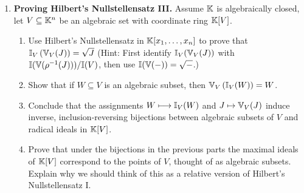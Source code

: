 \documentclass[12pt,reqno]{amsart}
\begin{document}
\begin{enumerate}[leftmargin=*]
\item\label{ex:hilb3-3} \textbf{Proving Hilbert's Nullstellensatz III.} Assume $\mathbb{K}$ is algebraically closed, let $V\subseteq \mathbb{K}^n$ be an algebraic set with coordinate ring $\mathbb{K}[V]$.
\begin{enumerate}[label=(\alph*),ref=\theenumi\alph*]
	\item Use Hilbert's Nullstellensatz in $\mathbb{K}[x_1,\ldots,x_n]$ to prove that $\mathbb{I}_V\left(\mathbb{V}_V(J )\right)=\sqrt{J}$ (Hint: First identify $\mathbb{I}_V(\mathbb{V}_V(J))$ with $\mathbb{I}(\mathbb{V}(\rho^{-1}(J)))/\mathbb{I}(V)$, then use $\mathbb{I}(\mathbb{V}(-))=\sqrt{-}$.)

	\item Show that if $W\subseteq V$ is an algebraic subset, then $\mathbb{V}_V\left(\mathbb{I}_V(W)\right)=W$.

	\item Conclude that the assignments $W\longmapsto \mathbb{I}_V(W)$ and $J\mapsto \mathbb{V}_V(J)$ induce inverse, inclusion-reversing bijections between algebraic subsets of $V$ and radical ideals in $\mathbb{K}[V]$. 

	\item Prove that under the bijections in the previous parts the maximal ideals of $\mathbb{K}[V]$ correspond to the points of $V$, thought of as algebraic subsets. Explain why we should think of this as a relative version of Hilbert's Nullstellensatz I.  
\end{enumerate}



\end{enumerate}
\end{document}
